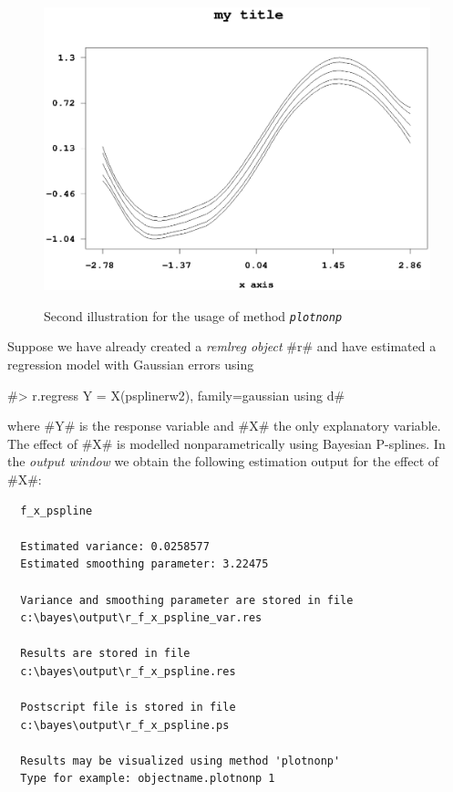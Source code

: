 \begin{figure}[ht]
\begin{center}
\includegraphics[scale=0.8]{grafiken/remlregplotnonpexample2.ps}
{\em \caption{ \label{remlregplotnonpexample2} Second illustration
for the usage of method \em\texttt{plotnonp}}}
\end{center}
\end{figure}

Suppose we have already created a {\em remlreg object} #r# and
have estimated a regression model with Gaussian errors using

#> r.regress Y = X(psplinerw2), family=gaussian using d#

where #Y# is the response variable and #X# the only explanatory
variable. The effect of #X# is modelled nonparametrically  using
Bayesian P-splines. In the {\em output window} we obtain the
following estimation output for the effect of #X#:

\begin{verbatim}
  f_x_pspline

  Estimated variance: 0.0258577
  Estimated smoothing parameter: 3.22475

  Variance and smoothing parameter are stored in file
  c:\bayes\output\r_f_x_pspline_var.res

  Results are stored in file
  c:\bayes\output\r_f_x_pspline.res

  Postscript file is stored in file
  c:\bayes\output\r_f_x_pspline.ps

  Results may be visualized using method 'plotnonp'
  Type for example: objectname.plotnonp 1
\end{verbatim}

